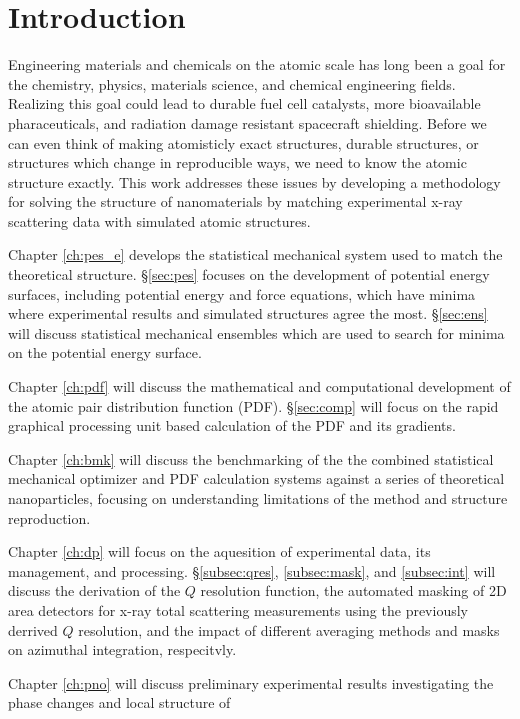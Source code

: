\chapter*{Introduction} \label{intro}
Engineering materials and chemicals on the atomic scale has long been a goal for the chemistry, physics, materials science, and chemical engineering fields.
Realizing this goal could lead to durable fuel cell catalysts, more bioavailable pharaceuticals, and radiation damage resistant spacecraft shielding.
Before we can even think of making atomisticly exact structures, durable structures, or structures which change in reproducible ways, we need to know the atomic structure exactly.
This work addresses these issues by developing a methodology for solving the structure of nanomaterials by matching experimental x-ray scattering data with simulated atomic structures.

Chapter \ref{ch:pes_e} develops the statistical mechanical system used to match the theoretical structure.
\S \ref{sec:pes} focuses on the development of potential energy surfaces, including potential energy and force equations, which have minima where experimental results and simulated structures agree the most.
\S \ref{sec:ens} will discuss statistical mechanical ensembles which are used to search for minima on the potential energy surface.

Chapter \ref{ch:pdf} will discuss the mathematical and computational development of the atomic pair distribution function (PDF).
\S \ref{sec:comp} will focus on the rapid graphical processing unit based calculation of the PDF and its gradients.

Chapter \ref{ch:bmk} will discuss the benchmarking of the the combined statistical mechanical optimizer and PDF calculation systems against a series of theoretical nanoparticles, focusing on understanding limitations of the method and structure reproduction.

Chapter \ref{ch:dp} will focus on the aquesition of experimental data, its management, and processing.
\S \ref{subsec:qres}, \ref{subsec:mask}, and \ref{subsec:int} will discuss the derivation of the $Q$ resolution function, the automated masking of 2D area detectors for x-ray total scattering measurements using the previously derrived $Q$ resolution, and the impact of different averaging methods and masks on azimuthal integration, respecitvly.

Chapter \ref{ch:pno} will discuss preliminary experimental results investigating the phase changes and local structure of 